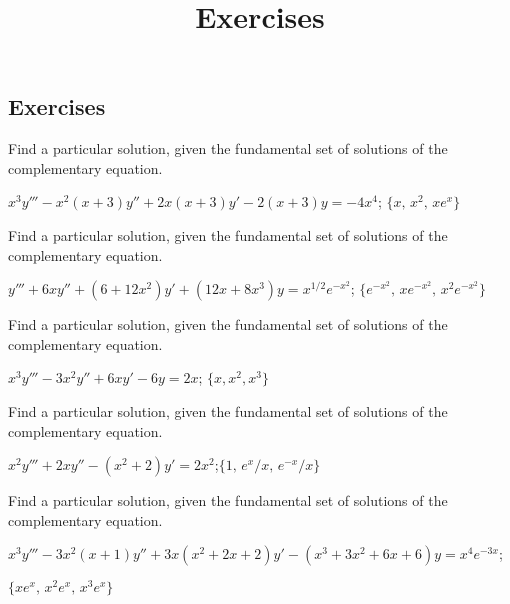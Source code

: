 \documentclass{ximera}
\title{Exercises} \license{CC BY-NC-SA 4.0}
\begin{document}
\begin{abstract}
\end{abstract}
\maketitle

\begin{onlineOnly}
\section*{Exercises}
\end{onlineOnly}

\begin{problem}\label{exer:9.4.1}
Find a particular
solution, given the fundamental set of solutions of the complementary equation.

$x^3y'''-x^2(x+3)y''+2x(x+3)y'-2(x+3)y=-4x^4$;\quad
$\{x,\,x^2,\,xe^x\}$
\newpage
\end{problem}

\begin{problem}\label{exer:9.4.2}
Find a particular
solution, given the fundamental set of solutions of the complementary equation.

$y'''+6xy''+(6+12x^2)y'+(12x+8x^3)y=x^{1/2}e^{-x^2}$;\quad
 $\{e^{-x^2},\,xe^{-x^2},\,x^2e^{-x^2}\}$
\end{problem}


\begin{problem}\label{exer:9.4.3} 
Find a particular
solution, given the fundamental set of solutions of the complementary equation.

$x^3y'''-3x^2y''+6xy'-6y=2x$;
 \quad  $\{x,x^2,x^3\}$
\end{problem}

\begin{problem}\label{exer:9.4.4}
Find a particular
solution, given the fundamental set of solutions of the complementary equation.

$x^2y'''+2xy''-(x^2+2)y'=2x^2$;\quad   $\{1,\,e^x/x,\,e^{-x}/x\}$
\end{problem}

\begin{problem}\label{exer:9.4.5}
Find a particular
solution, given the fundamental set of solutions of the complementary equation.

$x^3y'''-3x^2(x+1)y''+3x(x^2+2x+2)y'-(x^3+3x^2+6x+6)y=x^4e^{-3x}$;\quad

$\{xe^x,\,x^2e^x,\,x^3e^x\}$
\end{problem}
\end{document}
